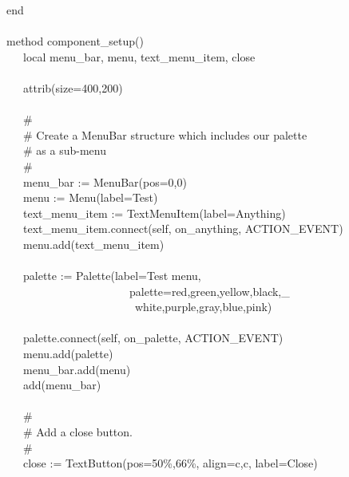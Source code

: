 {\>   end \\
\ \\
\>   method component\_setup() \\
\>   \ \ \ local menu\_bar, menu, text\_menu\_item, close \\
\ \\
\>   \ \ \ attrib({\textquotedbl}size=400,200{\textquotedbl}) \\
\ \\
\>   \ \ \ \# \\
\>   \ \ \ \# Create a MenuBar structure which includes our palette  \\
\>   \ \ \ \# as a sub-menu \\
\>   \ \ \ \# \\
\>   \ \ \ menu\_bar := MenuBar({\textquotedbl}pos=0,0{\textquotedbl}) \\
\>   \ \ \ menu := Menu({\textquotedbl}label=Test{\textquotedbl}) \\
\>   \ \ \ text\_menu\_item :=
TextMenuItem({\textquotedbl}label=Anything{\textquotedbl}) \\
\>   \ \ \ text\_menu\_item.connect(self,
{\textquotedbl}on\_anything{\textquotedbl}, ACTION\_EVENT) \\
\>   \ \ \ menu.add(text\_menu\_item) \\
\ \\
\>   \ \ \ palette := Palette({\textquotedbl}label=Test
menu{\textquotedbl}, \\
\>   \ \ \ \ \ \ \ \ \ \ \ \ \ \ \ \ \ \ \ \ \ \ {\textquotedbl}palette=red,green,yellow,black,\_ \\
\>   \ \ \ \ \ \ \ \ \ \ \ \ \ \ \ \ \ \ \ \ \ \ \ white,purple,gray,blue,pink{\textquotedbl}) \\
\ \\
\>   \ \ \ palette.connect(self,
{\textquotedbl}on\_palette{\textquotedbl}, ACTION\_EVENT) \\
\>   \ \ \ menu.add(palette) \\
\>   \ \ \ menu\_bar.add(menu) \\
\>   \ \ \ add(menu\_bar) \\
\ \\
\>   \ \ \ \# \\
\>   \ \ \ \# Add a close button.  \\
\>   \ \ \ \# \\
\>   \ \ \ close :=
TextButton({\textquotedbl}pos=50\%,66\%{\textquotedbl},
{\textquotedbl}align=c,c{\textquotedbl},
{\textquotedbl}label=Close{\textquotedbl}) \\
}
